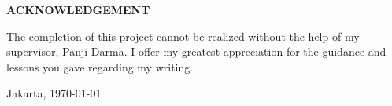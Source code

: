 \begin{center}
	\fontsize{14bp}{1.5\baselineskip}\selectfont
	\textbf{ACKNOWLEDGEMENT}
\end{center}
\begin{justify}
	\begin{doublespace}
		The completion of this project cannot be realized without the help of my supervisor, Panji Darma. I offer my greatest appreciation for the guidance and lessons you gave regarding my writing.
	\end{doublespace}
	\fontsize{12bp}{18bp}\selectfont

	\noindent Jakarta, \today
	
	
	\noindent \AUTHOR
\end{justify}
\pagebreak
